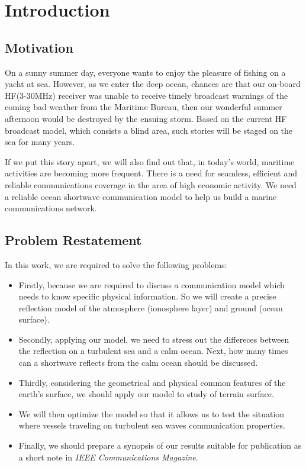 \documentclass{mcmthesis}
\begin{document}
\tableofcontents
\newpage

\section{Introduction}

\subsection{Motivation}

On a sunny summer day, everyone wants to enjoy the pleasure of fishing on a yacht at sea. However, as we enter the deep ocean, chances are that our on-board HF(3-30MHz) receiver was unable to receive timely broadcast warnings of the coming bad weather from the Maritime Bureau, then our wonderful summer afternoon would be destroyed by the ensuing storm. Based on the current HF broadcast model, which consists a blind area, such stories will be staged on the sea for many years.

If we put this story apart, we will also find out that, in today's world, maritime activities are becoming more frequent. There is a need for seamless, efficient and reliable communications coverage in the area of high economic activity. We need a reliable ocean shortwave communication model to help us build a marine communications network.

\subsection{Problem Restatement}

In this work, we are required to solve the following problems:

\begin{itemize}
  \item Firstly, because we are required to discuss a communication model which needs to know specific physical information. So we will create a precise reflection model of the atmosphere (ionosphere layer) and ground (ocean surface).\\
  \item Secondly, applying our model, we need to stress out the differeces between the reflection on a turbulent sea and a calm ocean. Next, how many times can a shortwave reflects from the calm ocean should be discussed. \\
  \item Thirdly, considering the geometrical and physical common features of the earth's surface, we should apply our model to study of terrain surface.\\
  \item We will then optimize the model so that it allows us to test the situation where vessels traveling on turbulent sea waves communication properties. \\
  \item Finally, we should prepare a synopsis of our results suitable for publication as a short note in \emph{IEEE Communications Magazine}.
\end{itemize}
\end{document}
